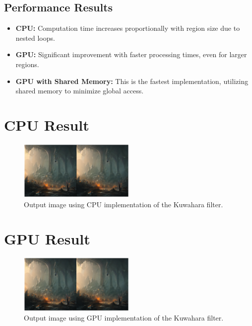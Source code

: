 \documentclass{article}
\begin{document}
\subsection{Performance Results}
\begin{itemize}
    \item \textbf{CPU:} Computation time increases proportionally with region size due to nested loops.
    \item \textbf{GPU:} Significant improvement with faster processing times, even for larger regions.
    \item \textbf{GPU with Shared Memory:} This is the fastest implementation, utilizing shared memory to minimize global access.
\end{itemize}


\section{CPU Result}
\begin{figure}[h!]
    \centering
    \includegraphics[width=0.5\textwidth]{src/cpu_result.png} 
    \caption{Output image using CPU implementation of the Kuwahara filter.}
\end{figure}

\section{GPU Result}
\begin{figure}[h!]
    \centering
    \includegraphics[width=0.5\textwidth]{src/gpu_result.png} 
    \caption{Output image using GPU implementation of the Kuwahara filter.}
\end{figure}
\end{document}
